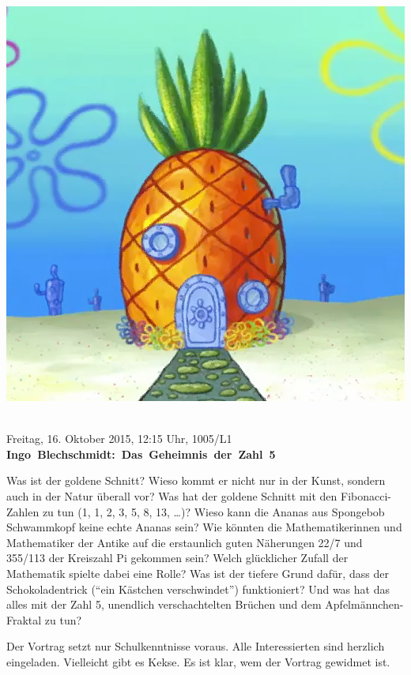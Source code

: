 \documentclass[a4paper,ngerman,landscape]{scrartcl}
\begin{document}
\begin{center}
  \vspace*{1.5em}
  \includegraphics[height=0.9\textheight]{spongebob-ananas}
  \vfill
  \newpage
  \vspace*{1.5em}
  \Huge
   \\[0.8em]
   \\[0.8em]
  \vspace{0.2em}

  Freitag, 16. Oktober 2015, 12:15 Uhr, 1005/L1 \\
  \mbox{\textbf{Ingo Blechschmidt: Das Geheimnis der Zahl 5}}
  \vspace{1em}

  \huge
  \begin{minipage}{0.99\textwidth}
    \setlength\parskip{\medskipamount}
    Was ist der goldene Schnitt? Wieso kommt er nicht nur in der Kunst, sondern
    auch in der Natur überall vor? Was hat der goldene Schnitt mit den
    Fibonacci-Zahlen zu tun (1, 1, 2, 3, 5, 8, 13, \ldots)? Wieso kann die Ananas
    aus Spongebob Schwammkopf keine echte Ananas sein? Wie könnten die
    Mathematikerinnen und Mathematiker der Antike auf die erstaunlich guten
    Näherungen 22/7 und 355/113 der Kreiszahl Pi gekommen sein? Welch
    glücklicher Zufall der Mathematik spielte dabei eine Rolle? Was ist der
    tiefere Grund dafür, dass der Schokoladentrick ("`ein Kästchen
    verschwindet"') funktioniert? Und was hat das alles mit der Zahl 5,
    unendlich verschachtelten Brüchen und dem Apfelmännchen-Fraktal zu tun?

    Der Vortrag setzt nur Schulkenntnisse voraus. Alle Interessierten sind
    herzlich eingeladen. Vielleicht gibt es Kekse. Es ist klar, wem der Vortrag
    gewidmet ist.
    \vspace{0.3em}
  \end{minipage}
\end{center}
\end{document}
